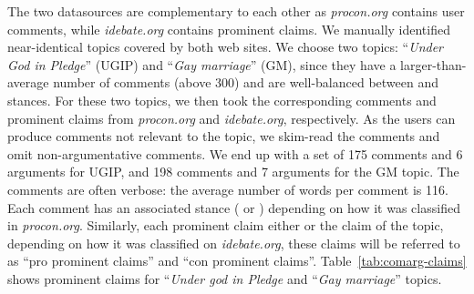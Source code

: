 The two datasources are complementary to each other as \textit{procon.org}
contains user comments, while \textit{idebate.org} contains prominent claims. 
We manually identified near-identical topics covered by both web sites. 
We choose two topics: ``\textit{Under God in Pledge}'' (UGIP) and 
``\textit{Gay marriage}'' (GM), since
they have a larger-than-average number of comments (above 300) and are 
well-balanced between  and  stances. 
For these two topics, we then took the corresponding comments and prominent claims
from \textit{procon.org} and \textit{idebate.org}, respectively. 
As the users can produce comments not relevant to the topic, we skim-read 
the comments and omit non-argumentative comments.  We end up with a set of 175
comments and 6 arguments for UGIP, and 198 comments and 7 arguments for the GM
topic. 
The comments are often verbose: the average number of words per comment is 116. 
Each comment has an associated stance ( or ) depending on 
how it was classified in \textit{procon.org}. 
Similarly, each prominent claim either  or  the claim of the topic,
depending on how it was classified on \textit{idebate.org}, these claims will be referred to 
as ``pro prominent claims'' and ``con prominent claims''. 
Table~\ref{tab:comarg-claims} shows prominent claims for ``\emph{Under god in Pledge}
and ``\textit{Gay marriage}'' topics. 

